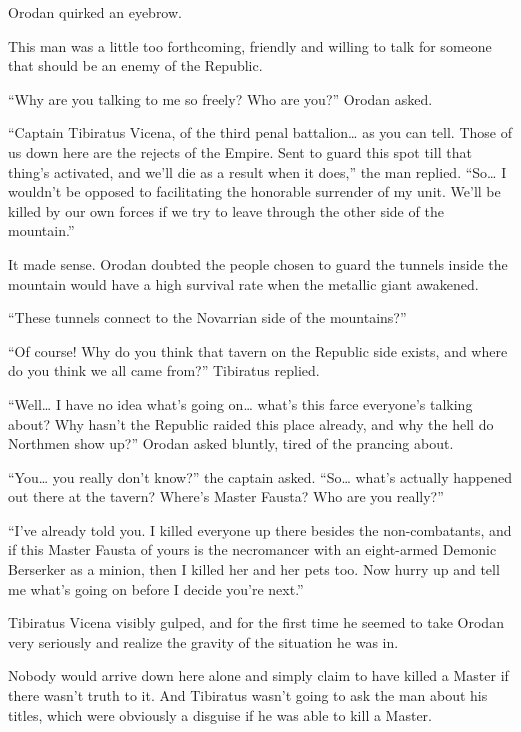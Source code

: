 \documentclass[a4paper,10pt]{book}
\begin{document}
Orodan quirked an eyebrow.\par
This man was a little too forthcoming, friendly and willing to talk for someone that should be an enemy of the Republic.\par
“Why are you talking to me so freely? Who are you?” Orodan asked.\par
“Captain Tibiratus Vicena, of the third penal battalion… as you can tell. Those of us down here are the rejects of the Empire. Sent to guard this spot till that thing’s activated, and we’ll die as a result when it does,” the man replied. “So… I wouldn’t be opposed to facilitating the honorable surrender of my unit. We’ll be killed by our own forces if we try to leave through the other side of the mountain.”\par
It made sense. Orodan doubted the people chosen to guard the tunnels inside the mountain would have a high survival rate when the metallic giant awakened.\par
“These tunnels connect to the Novarrian side of the mountains?”\par
“Of course! Why do you think that tavern on the Republic side exists, and where do you think we all came from?” Tibiratus replied.\par
“Well… I have no idea what’s going on… what’s this farce everyone’s talking about? Why hasn’t the Republic raided this place already, and why the hell do Northmen show up?” Orodan asked bluntly, tired of the prancing about.\par
“You… you really don’t know?” the captain asked. “So… what’s actually happened out there at the tavern? Where’s Master Fausta? Who are you really?”\par
“I’ve already told you. I killed everyone up there besides the non-combatants, and if this Master Fausta of yours is the necromancer with an eight-armed Demonic Berserker as a minion, then I killed her and her pets too. Now hurry up and tell me what’s going on before I decide you’re next.”\par
Tibiratus Vicena visibly gulped, and for the first time he seemed to take Orodan very seriously and realize the gravity of the situation he was in.\par
Nobody would arrive down here alone and simply claim to have killed a Master if there wasn’t truth to it. And Tibiratus wasn’t going to ask the man about his titles, which were obviously a disguise if he was able to kill a Master.\par
\end{document}
